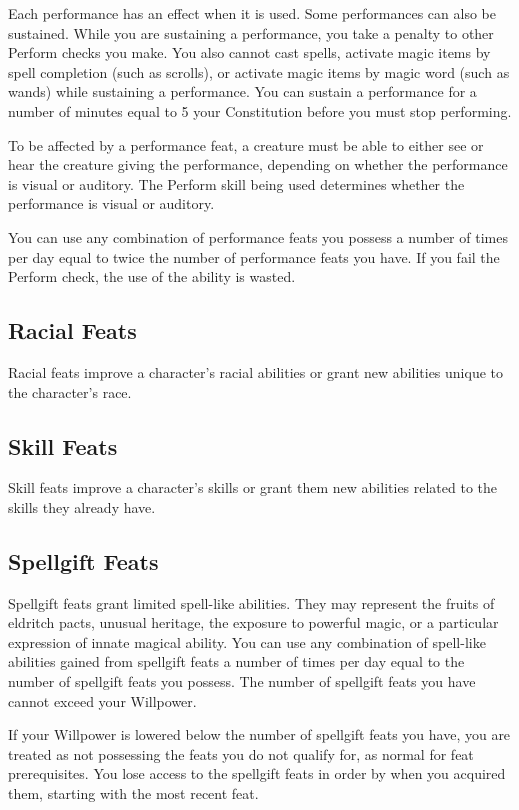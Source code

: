 Each performance has an effect when it is used.
Some performances can also be sustained.
While you are sustaining a performance, you take a  penalty to other Perform checks you make.
You also cannot cast spells, activate magic items by spell completion (such as scrolls), or activate magic items by magic word (such as wands) while sustaining a performance.
You can sustain a performance for a number of minutes equal to 5 \add your Constitution before you must stop performing.

To be affected by a performance feat, a creature must be able to either see or hear the creature giving the performance, depending on whether the performance is visual or auditory.
The Perform skill being used determines whether the performance is visual or auditory.

You can use any combination of performance feats you possess a number of times per day equal to twice the number of performance feats you have.
If you fail the Perform check, the use of the ability is wasted.

\subsection{Racial Feats}\label{Racial Feats}
Racial feats improve a character's racial abilities or grant new abilities unique to the character's race.

\subsection{Skill Feats}
Skill feats improve a character's skills or grant them new abilities related to the skills they already have.

\subsection{Spellgift Feats}
Spellgift feats grant limited spell-like abilities.
They may represent the fruits of eldritch pacts, unusual heritage, the exposure to powerful magic, or a particular expression of innate magical ability.
You can use any combination of spell-like abilities gained from spellgift feats a number of times per day equal to the number of spellgift feats you possess.
The number of spellgift feats you have cannot exceed your Willpower.

If your Willpower is lowered below the number of spellgift feats you have, you are treated as not possessing the feats you do not qualify for, as normal for feat prerequisites.
You lose access to the spellgift feats in order by when you acquired them, starting with the most recent feat.

